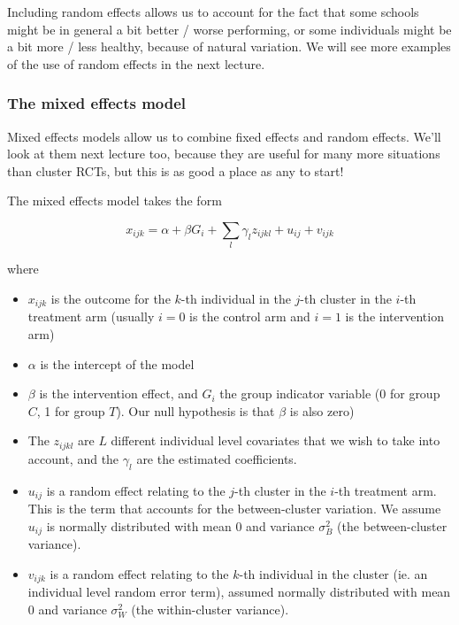 \documentclass[
  openany]{book}
\providecommand{\tightlist}{%
  \setlength{\itemsep}{0pt}\setlength{\parskip}{0pt}}
\theoremstyle{definition}
\theoremstyle{definition}
\theoremstyle{definition}
\theoremstyle{definition}
\theoremstyle{remark}
\begin{document}
Including random effects allows us to account for the fact that some schools might be in general a bit better / worse performing, or some individuals might be a bit more / less healthy, because of natural variation. We will see more examples of the use of random effects in the next lecture.

\hypertarget{the-mixed-effects-model}{%
\subsubsection*{The mixed effects model}\label{the-mixed-effects-model}}

Mixed effects models allow us to combine fixed effects and random effects. We'll look at them next lecture too, because they are useful for many more situations than cluster RCTs, but this is as good a place as any to start!

The mixed effects model takes the form

\begin{equation}
x_{ijk} = \alpha + \beta G_i + \sum\limits_l \gamma_l z_{ijkl} + u_{ij} + v_{ijk}
\label{eq:remodel}
\end{equation}

where

\begin{itemize}
\tightlist
\item
  \(x_{ijk}\) is the outcome for the \(k\)-th individual in the \(j\)-th cluster in the \(i\)-th treatment arm (usually \(i=0\) is the control arm and \(i=1\) is the intervention arm)
\item
  \(\alpha\) is the intercept of the model
\item
  \(\beta\) is the intervention effect, and \(G_i\) the group indicator variable (0 for group \(C\), 1 for group \(T\)). Our null hypothesis is that \(\beta\) is also zero)
\item
  The \(z_{ijkl}\) are \(L\) different individual level covariates that we wish to take into account, and the \(\gamma_l\) are the estimated coefficients.
\item
  \(u_{ij}\) is a random effect relating to the \(j\)-th cluster in the \(i\)-th treatment arm. This is the term that accounts for the between-cluster variation. We assume \(u_{ij}\) is normally distributed with mean 0 and variance \(\sigma^2_B\) (the between-cluster variance).
\item
  \(v_{ijk}\) is a random effect relating to the \(k\)-th individual in the cluster (ie. an individual level random error term), assumed normally distributed with mean 0 and variance \(\sigma^2_W\) (the within-cluster variance).
\end{itemize}
\end{document}
